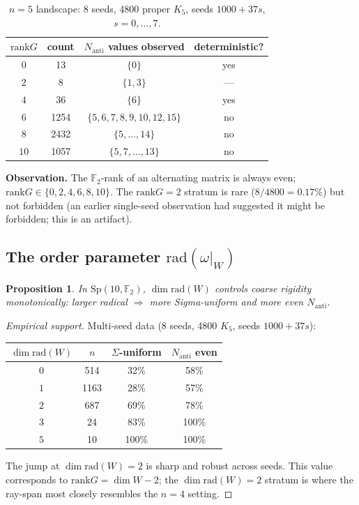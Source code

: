 \documentclass[11pt,a4paper]{article}
\newtheorem{proposition}[theorem]{Proposition}
\theoremstyle{remark}
\newcommand{\Sp}{\mathrm{Sp}}
\newcommand{\rad}{\mathrm{rad}}
\newcommand{\rank}{\mathrm{rank}}
\newcommand{\Nanti}{N_{\mathrm{anti}}}
\begin{document}
\begin{table}[H]
\centering
\caption{$n=5$ landscape: 8 seeds, 4800 proper $K_5$, seeds $1000+37s$,
  $s=0,\ldots,7$.}
\label{tab:landscape}
\begin{tabular}{cccc}
\toprule
$\rank G$ & count & $\Nanti$ values observed & deterministic? \\
\midrule
$0$ & 13  & $\{0\}$ & yes \\
$2$ & 8   & $\{1,3\}$ & --- \\
$4$ & 36  & $\{6\}$ & yes \\
$6$ & 1254 & $\{5,6,7,8,9,10,12,15\}$ & no \\
$8$ & 2432 & $\{5,\ldots,14\}$ & no \\
$10$ & 1057 & $\{5,7,\ldots,13\}$ & no \\
\bottomrule
\end{tabular}
\end{table}

\noindent
\textbf{Observation.}  The $\mathbb F_2$-rank of an alternating matrix is always even;
$\rank G\in\{0,2,4,6,8,10\}$.
The $\rank G=2$ stratum is rare ($8/4800=0.17\%$) but not forbidden (an earlier
single-seed observation had suggested it might be forbidden; this is an artifact).

\subsection{\texorpdfstring{The order parameter $\rad(\omega|_W)$}{The order parameter rad(omega|W)}}

\begin{proposition}\label{prop:radW}
In $\Sp(10,\mathbb F_2)$, $\dim\rad(W)$ controls coarse rigidity monotonically:
larger radical $\Rightarrow$ more Sigma-uniform and more even $\Nanti$.
\end{proposition}

\begin{proof}[Empirical support]
Multi-seed data (8 seeds, 4800 $K_5$, seeds $1000+37s$):
\begin{center}
\begin{tabular}{cccc}
\toprule
$\dim\rad(W)$ & $n$ & $\Sigma$-uniform & $\Nanti$ even \\
\midrule
$0$ & 514 & 32\% & 58\% \\
$1$ & 1163 & 28\% & 57\% \\
$2$ & 687 & 69\% & 78\% \\
$3$ & 24 & 83\% & 100\% \\
$5$ & 10 & 100\% & 100\% \\
\bottomrule
\end{tabular}
\end{center}
The jump at $\dim\rad(W)=2$ is sharp and robust across seeds.  This value corresponds
to $\rank G=\dim W-2$; the $\dim\rad(W)=2$ stratum is where the ray-span most closely
resembles the $n=4$ setting.
\end{proof}
\end{document}
